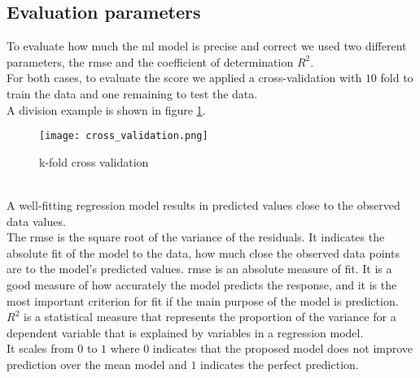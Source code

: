 \subsection{Evaluation parameters}
To evaluate how much the \gls{ml} model is precise and correct we used two different parameters, the \gls{rmse} and the coefficient of determination $R^2$.
\\ \indent
For both cases, to evaluate the score we applied a cross-validation with $10$ fold to train the data and one remaining to test the data.
\\
A division example is shown in figure \ref{fig:cross_validation}.
\begin{figure}[h]
    \centering
    \texttt{[image: cross\_validation.png]} 
	\caption{k-fold cross validation}
    \label{fig:cross_validation}
\end{figure} 
\\
A well-fitting regression model results in predicted values close to the observed data values.
\\
The \gls{rmse} is the square root of the variance of the residuals. It indicates the absolute fit of the model to the data, how much close the observed data points are to the model's predicted values. \gls{rmse} is an absolute measure of fit. It is a good measure of how accurately the model predicts the response, and it is the most important criterion for fit if the main purpose of the model is prediction.
\\ \indent
$R^2$ is a statistical measure that represents the proportion of the variance for a dependent variable that is explained by variables in a regression model.
\\
It scales from $0$ to $1$ where $0$ indicates that the proposed model does not improve prediction over the mean model and $1$ indicates the perfect prediction.